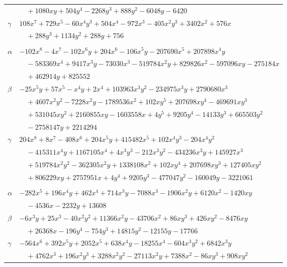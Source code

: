 \documentclass[11pt]{article}
\begin{document}
\begin{longtable}{@{}ll@{}}
 & $\quad +1080xy+504y^{4}-2268y^{3}+888y^{2}-6048y-6420$\\
$\gamma$ & $108x^{7}+729x^{5}-60x^{4}y^{3}+504x^{4}-972x^{3}-405x^{2}y^{3}+3402x^{2}+576x$\\
 & $\quad +288y^{3}+1134y^{2}+288y+756$\\
\addlinespace[3pt]
\multicolumn{2}{@{}l}{$\{i,j\}=\{20,21\}$, $k_{ij}=2^{4}\cdot 3^{5}\cdot 7^{2}\cdot 13$}\\
$\alpha$ & $-102x^{8}-4x^{7}-102x^{6}y+204x^{6}-106x^{5}y-207690x^{5}+207898x^{4}y$\\
 & $\quad -583369x^{4}+9417x^{3}y-73030x^{3}-519784x^{2}y+829826x^{2}-597096xy-275184x$\\
 & $\quad +462914y+825552$\\
$\beta$ & $-25x^{5}y+57x^{5}-x^{4}y+2x^{4}+103963x^{3}y^{2}-234975x^{3}y+2790680x^{3}$\\
 & $\quad +4607x^{2}y^{2}-7228x^{2}y-1789536x^{2}+102xy^{5}+207698xy^{4}-469691xy^{3}$\\
 & $\quad +531045xy^{2}+2160855xy-1603558x+4y^{5}+9205y^{4}-14133y^{3}+665503y^{2}$\\
 & $\quad -2758147y+2214294$\\
$\gamma$ & $204x^{8}+8x^{7}-408x^{6}+204x^{5}y+415482x^{5}+102x^{4}y^{3}-204x^{4}y^{2}$\\
 & $\quad -415311x^{4}y+1167105x^{4}+4x^{3}y^{3}-212x^{3}y^{2}-434236x^{3}y+145927x^{3}$\\
 & $\quad +519784x^{2}y^{2}-362305x^{2}y+1338108x^{2}+102xy^{4}+207698xy^{3}+127405xy^{2}$\\
 & $\quad +806229xy+2757951x+4y^{4}+9205y^{3}-477047y^{2}-160049y-3221061$\\
\addlinespace[3pt]
\multicolumn{2}{@{}l}{$\{i,j\}=\{21,138\}$, $k_{ij}=2^{3}\cdot 3^{6}\cdot 7$}\\
$\alpha$ & $-282x^{5}+196x^{4}y+462x^{4}+714x^{3}y-7088x^{3}-1906x^{2}y+6120x^{2}-1420xy$\\
 & $\quad -4536x-2232y+13608$\\
$\beta$ & $-6x^{3}y+25x^{3}-40x^{2}y^{2}+11366x^{2}y-43706x^{2}+86xy^{3}+426xy^{2}-8476xy$\\
 & $\quad +26368x-196y^{4}-754y^{3}+14815y^{2}-12155y-17766$\\
$\gamma$ & $-564x^{6}+392x^{5}y+2052x^{5}+638x^{4}y-18255x^{4}-604x^{3}y^{2}+6842x^{3}y$\\
 & $\quad +4762x^{3}+196x^{2}y^{3}+3288x^{2}y^{2}-27113x^{2}y+7388x^{2}-86xy^{3}+908xy^{2}$\\

\end{longtable}
\end{document}
